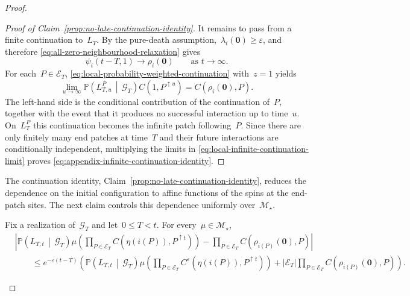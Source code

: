 \documentclass[EJP,preprint,NODS,nobera]{ejpecp}
\newcommand{\pP}{\mathbb{P}}
\newcommand{\CP}[2]{\pP\bb{#1\,\middle|\,#2}}
\newcommand{\bb}[1]{\left(#1\right)}
\newcommand{\abs}[1]{\left|#1\right|}
\newcommand{\mb}[1]{\mathbf{#1}}
\begin{document}
\begin{proof}
\begin{proof}[Proof of Claim~\ref{prop:no-late-continuation-identity}]
It remains to pass from a finite continuation to~$L_T$. By the pure-death
assumption,~$\lambda_i(\mb 0)\geq\varepsilon$, and therefore
\eqref{eq:all-zero-neighbourhood-relaxation} gives
\begin{equation*}
\psi_i(t-T,1)\longrightarrow\rho_i(\mb 0)
\qquad\text{as }t\to\infty.
\end{equation*}
For each~$P\in\mathcal E_T$,
\eqref{eq:local-probability-weighted-continuation} with~$z=1$ yields
\begin{equation}
\label{eq:local-infinite-continuation-limit}
\lim_{u\to\infty}
\CP{L_{T,u}^P}{\mathcal G_T}
C\bb{1,P^{\uparrow u}}
=
C\bb{\rho_i(\mb 0),P}.
\end{equation}
The left-hand side is the conditional contribution of the continuation of~$P$, together with the event that it produces no successful interaction up to
time~$u$. On~$L_T^P$ this continuation becomes the infinite patch following~$P$. Since there are only finitely many end patches at time~$T$ and their
future interactions are conditionally independent, multiplying the limits in
\eqref{eq:local-infinite-continuation-limit} proves
\eqref{eq:appendix-infinite-continuation-identity}.
\end{proof}

The continuation identity, Claim~\ref{prop:no-late-continuation-identity}, reduces the dependence on the initial configuration
to affine functions of the spins at the end-patch sites. The next claim
controls this dependence uniformly over~$\mathcal M_\star$.

\begin{claim}
\label{lem:end-factor-relaxation}
Fix a realization of~$\mathcal G_T$ and let~$0\leq T<t$. For every~$\mu\in\mathcal M_\star$,
\begin{align*}
&\abs{
 \CP{L_{T,t}}{\mathcal G_T}
 \mu\bb{
  \prod_{P\in\mathcal E_T}
  C\bb{\eta\bb{i(P)},P^{\uparrow t}}
 }
 -
 \prod_{P\in\mathcal E_T}
 C\bb{\rho_{i(P)}(\mb 0),P}
}
\\
&\qquad\leq
e^{-\varepsilon(t-T)}
\bb{
 \CP{L_{T,t}}{\mathcal G_T}
 \mu\bb{
  \prod_{P\in\mathcal E_T}
  C^\varepsilon\bb{\eta\bb{i(P)},P^{\uparrow t}}
 }
 +
 \abs{\mathcal E_T}
 \prod_{P\in\mathcal E_T}
 C\bb{\rho_{i(P)}(\mb 0),P}
}.
\end{align*}
\end{claim}


\end{proof}
\end{document}
